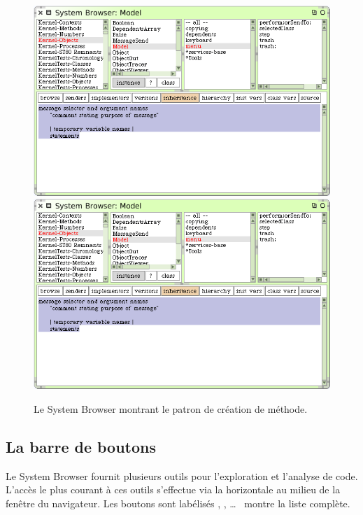 \documentclass[a4paper,10pt,twoside]{book}
\begin{document}
\begin{figure}[htbp]
   \centering
   \ifluluelse
	   {\includegraphics [width=\textwidth]{SystemBrowserMethodTemplate}}
	   {\includegraphics[scale=.7]{SystemBrowserMethodTemplate}}
   \caption{Le System Browser montrant le patron de cr\'eation de
     m\'ethode.
   \label{fig:SystemBrowserMethodTemplate}}
\end{figure}

\subsection{La barre de boutons}
\label{sec:ButtonBar}

Le System Browser fournit plusieurs outils pour l'exploration et 
l'analyse de code. 
L'acc\`es le plus courant \`a ces outils s'effectue via la 
 horizontale au milieu
de la fen\^etre du navigateur. Les boutons sont lab\'elis\'es 
, , \ldots{}\ %
 montre la liste compl\`ete.
\end{document}
